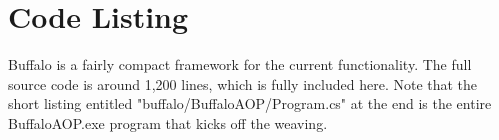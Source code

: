 \chapter{Code Listing}

Buffalo is a fairly compact framework for the current functionality. The full source code is around 1,200 lines, which is fully included here. Note that the short listing entitled "buffalo/BuffaloAOP/Program.cs" at the end is the entire BuffaloAOP.exe program that kicks off the weaving.

\vspace{5mm}

